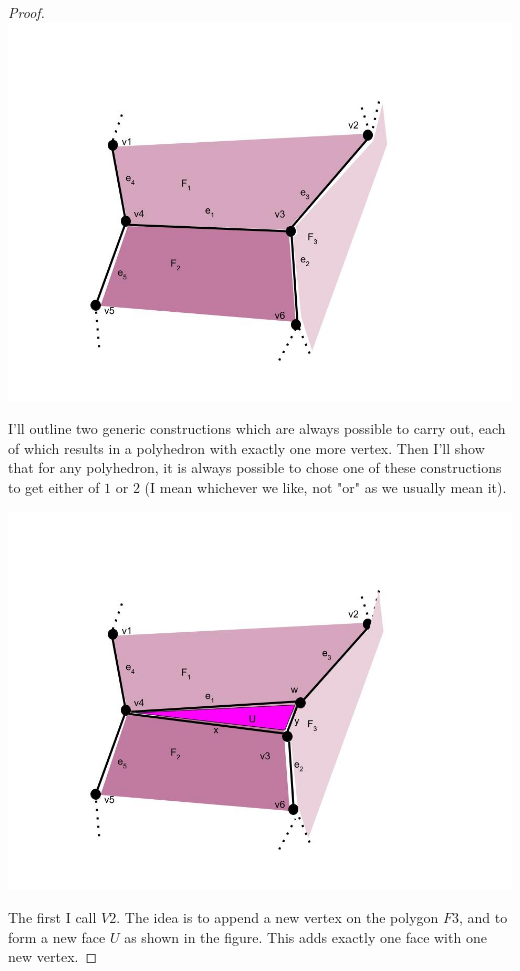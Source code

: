 \documentclass[12pt]{article}
\theoremstyle{definition}
\begin{document}
\begin{proof}

\includegraphics[scale=0.5]{General Polyhedron edge (1).jpg} 

I'll outline two generic constructions which are always possible to carry out, each of which results in a polyhedron with exactly one more vertex. Then I'll show that for any polyhedron, it is always possible to chose one of these constructions to get either of $1$ or $2$ (I mean whichever we like, not "or" as we usually mean it).

\includegraphics[scale=0.5]{V1.jpg} 

The first I call $V2$. The idea is to append a new vertex on the polygon $F3$, and to form a new face $U$ as shown in the figure. This adds exactly one face with one new vertex.


\end{proof}
\end{document}
